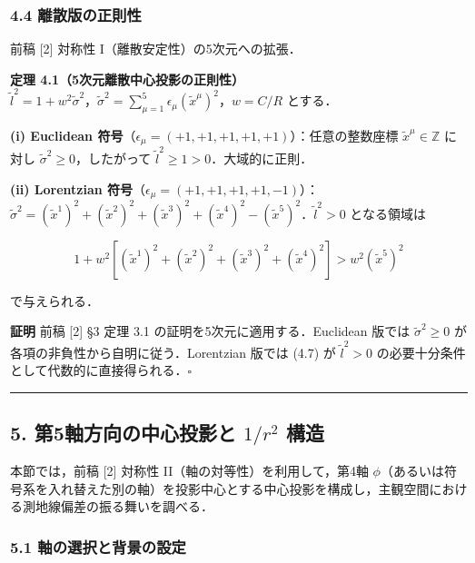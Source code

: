 \documentclass[a4paper,11pt]{ltjsarticle}
\theoremstyle{definition}
\begin{document}
\subsubsection{4.4 離散版の正則性}\label{ux96e2ux6563ux7248ux306eux6b63ux5247ux6027}

前稿 {[}2{]} 対称性 I（離散安定性）の5次元への拡張．

\textbf{定理 4.1（5次元離散中心投影の正則性）}\\
\(\tilde{l}^2 = 1 + w^2 \tilde{\sigma}^2\)，\(\tilde{\sigma}^2 = \sum_{\mu=1}^{5} \epsilon_\mu (\tilde{x}^\mu)^2\)，\(w = C/R\) とする．

\textbf{(i) Euclidean 符号}（\(\epsilon_\mu = (+1,+1,+1,+1,+1)\)）：任意の整数座標 \(\tilde{x}^\mu \in \mathbb{Z}\) に対し \(\tilde{\sigma}^2 \geq 0\)，したがって \(\tilde{l}^2 \geq 1 > 0\)．大域的に正則．

\textbf{(ii) Lorentzian 符号}（\(\epsilon_\mu = (+1,+1,+1,+1,-1)\)）：\(\tilde{\sigma}^2 = (\tilde{x}^1)^2 + (\tilde{x}^2)^2 + (\tilde{x}^3)^2 + (\tilde{x}^4)^2 - (\tilde{x}^5)^2\)．\(\tilde{l}^2 > 0\) となる領域は

\[1 + w^2\left[(\tilde{x}^1)^2 + (\tilde{x}^2)^2 + (\tilde{x}^3)^2 + (\tilde{x}^4)^2\right] > w^2 (\tilde{x}^5)^2 \tag{4.7}\]

で与えられる．

\textbf{証明} 前稿 {[}2{]} §3 定理 3.1 の証明を5次元に適用する．Euclidean 版では \(\tilde{\sigma}^2 \geq 0\) が各項の非負性から自明に従う．Lorentzian 版では (4.7) が \(\tilde{l}^2 > 0\) の必要十分条件として代数的に直接得られる．\(\square\)

\begin{center}\rule{0.5\linewidth}{0.5pt}\end{center}

\subsection{\texorpdfstring{5. 第5軸方向の中心投影と \(1/r^2\) 構造}{5. 第5軸方向の中心投影と 1/r\^{}2 構造}}\label{ux7b2c5ux8ef8ux65b9ux5411ux306eux4e2dux5fc3ux6295ux5f71ux3068-1r2-ux69cbux9020}

本節では，前稿 {[}2{]} 対称性 II（軸の対等性）を利用して，第4軸 \(\phi\)（あるいは符号系を入れ替えた別の軸）を投影中心とする中心投影を構成し，主観空間における測地線偏差の振る舞いを調べる．

\subsubsection{5.1 軸の選択と背景の設定}\label{ux8ef8ux306eux9078ux629eux3068ux80ccux666fux306eux8a2dux5b9a}
\end{document}
